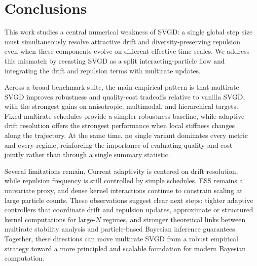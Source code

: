 \section{Conclusions}
\label{sec:conclusions}

This work studies a central numerical weakness of SVGD: a single global step
size must simultaneously resolve attractive drift and diversity-preserving
repulsion even when these components evolve on different effective time scales.
We address this mismatch by recasting SVGD as a split interacting-particle flow
and integrating the drift and repulsion terms with multirate updates.

Across a broad benchmark suite, the main empirical pattern is that multirate
SVGD improves robustness and quality-cost tradeoffs relative to vanilla SVGD,
with the strongest gains on anisotropic, multimodal, and hierarchical targets.
Fixed multirate schedules provide a simpler robustness baseline, while adaptive
drift resolution offers the strongest performance when local stiffness changes
along the trajectory. At the same time, no single variant dominates every
metric and every regime, reinforcing the importance of evaluating quality and
cost jointly rather than through a single summary statistic.

Several limitations remain. Current adaptivity is centered on drift resolution,
while repulsion frequency is still controlled by simple schedules. ESS remains a
univariate proxy, and dense kernel interactions continue to constrain scaling at
large particle counts. These observations suggest clear next steps: tighter
adaptive controllers that coordinate drift and repulsion updates, approximate or
structured kernel computations for large-$N$ regimes, and stronger theoretical
links between multirate stability analysis and particle-based Bayesian
inference guarantees. Together, these directions can move multirate SVGD from a
robust empirical strategy toward a more principled and scalable foundation for
modern Bayesian computation.
